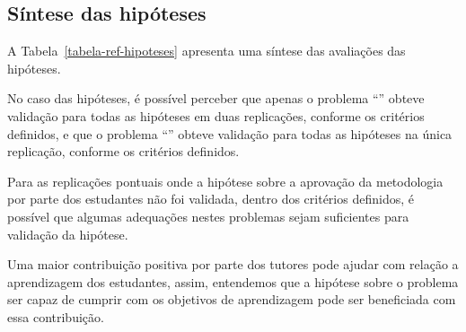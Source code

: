 \subsection{Síntese das hipóteses}
A Tabela~\ref{tabela-ref-hipoteses} apresenta
uma síntese das avaliações das hipóteses.


No caso das hipóteses, é possível perceber que apenas
o problema ``\ProblemaD'' obteve validação para todas as hipóteses
em duas replicações, conforme os critérios definidos, e que o
problema ``\ProblemaA'' obteve validação para todas as
hipóteses na única replicação, conforme os
critérios definidos.

Para as replicações pontuais onde a hipótese sobre
a aprovação da metodologia por parte dos estudantes não foi validada,
dentro dos critérios definidos, é possível que algumas adequações
nestes problemas sejam suficientes para
validação da hipótese.

Uma maior contribuição positiva por parte dos tutores pode ajudar
com relação a aprendizagem dos estudantes, assim, entendemos que
a hipótese sobre o problema ser capaz
de cumprir com os objetivos de aprendizagem pode
ser beneficiada com essa contribuição.
